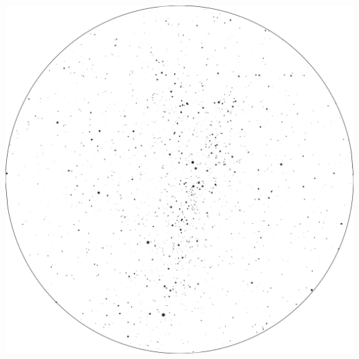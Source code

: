 \documentclass{./SAS-class-skygen}
\begin{document}
	\vspace{0.5cm}
    \begin{center}
    \includegraphics[width=\textwidth]{./pics/skychart21.png}
    \end{center}
    
    
\end{document}
